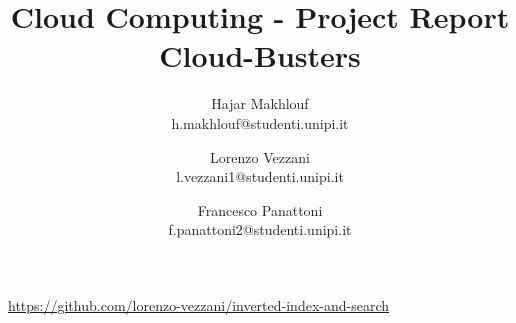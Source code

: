 \documentclass{article}
\title{Cloud Computing - Project Report \\ Cloud-Busters}
\author{
    Hajar Makhlouf  \\ h.makhlouf@studenti.unipi.it \and 
    Lorenzo Vezzani \\ l.vezzani1@studenti.unipi.it \and
    Francesco Panattoni \\ f.panattoni2@studenti.unipi.it}
\begin{document}
	
	\maketitle
	
	\begin{center}
		\scriptsize
		\href{https://github.com/lorenzo-vezzani/inverted-index-and-search}{https://github.com/lorenzo-vezzani/inverted-index-and-search}
	\end{center}

	
	
	\begin{multicols}{2}
	
	
	
	
	
	
	
	\end{multicols}
	
\end{document}
